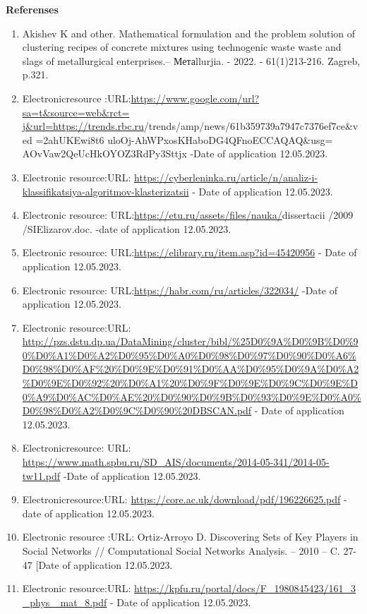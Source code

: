 {\bfseries Referenses}

\begin{enumerate}
\item
Akishev K and other. Mathematical formulation and the problem
solution of clustering recipes of concrete mixtures using technogenic
waste waste and slags of metallurgical enterprises.-- Метаllurjia. -
2022. - 61(1)213-216. Zagreb, p.321.

\item
Electronicresource
:URL:\href{https://www.google.com/url?sa=t\&source=web\&rct=\%20j\&url=https://trends.rbc.ru}{https://www.google.com/url?sa=t\&source=web\&rct=
j\&url=https://trends.rbc.ru}/trends/amp/news/61b359739a7947c7376ef7ce\&ved
=2ahUKEwi8t6 uloOj-AhWPxosKHaboDG4QFnoECCAQAQ\&usg=
AOvVaw2QeUcHkOYOZ3RdPy3Sttjx -Date of application 12.05.2023.

\item
Electronic resource:URL: \url{https://cyberleninka.ru/article/n/analiz-i-klassifikatsiya-algoritmov-klasterizatsii}
- Date of application 12.05.2023.

\item
Electronic resource: URL:\url{https://etu.ru/assets/files/nauka/}dissertacii /2009
/SIElizarov.doc. -date of application 12.05.2023.

\item
Electronic resource: URL:\url{https://elibrary.ru/item.asp?id=45420956} - Date of application
12.05.2023.

\item
Electronic resource: URL:\url{https://habr.com/ru/articles/322034/}
-Date of application 12.05.2023.

\item
Electronic resource:URL:
\url{http://pzs.dstu.dp.ua/DataMining/cluster/bibl/\%25D0\%9A\%D0\%9B\%D0\%90\%D0\%A1\%D0\%A2\%D0\%95\%D0\%A0\%D0\%98\%D0\%97\%D0\%90\%D0\%A6\%D0\%98\%D0\%AF\%20\%D0\%9E\%D0\%91\%D0\%AA\%D0\%95\%D0\%9A\%D0\%A2\%D0\%9E\%D0\%92\%20\%D0\%A1\%20\%D0\%9F\%D0\%9E\%D0\%9C\%D0\%9E\%D0\%A9\%D0\%AC\%D0\%AE\%20\%D0\%90\%D0\%9B\%D0\%93\%D0\%9E\%D0\%A0\%D0\%98\%D0\%A2\%D0\%9C\%D0\%90\%20DBSCAN.pdf}
- Date of application 12.05.2023.

\item
Electronicresource: URL:
\url{https://www.math.spbu.ru/SD_AIS/documents/2014-05-341/2014-05-tw11.pdf}
-Date of application 12.05.2023.

\item
Electronicresource:URL:
\url{https://core.ac.uk/download/pdf/196226625.pdf} - date of
application 12.05.2023.

\item
Electronic resource :URL: Ortiz-Arroyo D. Discovering Sets of Key
Players in Social Networks // Computational Social Networks Analysis. --
2010 -- C. 27-47 {[}Date of application 12.05.2023.

\item
Electronic resource:URL:
\href{https://kpfu.ru/portal/docs/F_1980845423/161_3\%20_phys\%20_mat_8.pdf}{https://kpfu.ru/portal/docs/F\_1980845423/161\_3
\_phys \_mat\_8.pdf} - Date of application 12.05.2023.
\end{enumerate}

